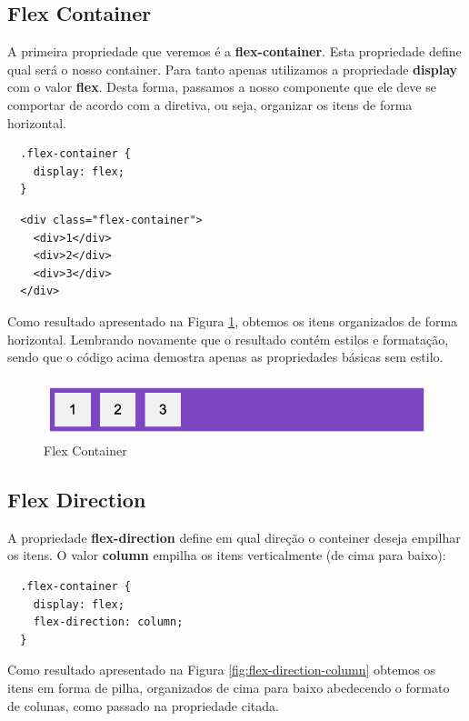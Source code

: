 \subsection{Flex Container}

A primeira propriedade que veremos é a \textbf{flex-container}. Esta propriedade define qual será o nosso container. Para tanto apenas utilizamos a propriedade \textbf{display} com o valor \textbf{flex}. Desta forma, passamos a nosso componente que ele deve se comportar de acordo com a diretiva, ou seja, organizar os itens de forma horizontal.

\begin{lstlisting}
  .flex-container {
    display: flex;
  } 
\end{lstlisting}

\begin{lstlisting}
  <div class="flex-container">
    <div>1</div>
    <div>2</div>
    <div>3</div>
  </div>
\end{lstlisting}

Como resultado apresentado na Figura \ref{fig:flex-container}, obtemos os itens organizados de forma horizontal. Lembrando novamente que o resultado contém estilos e formatação, sendo que o código acima demostra apenas as propriedades básicas sem estilo.

\begin{figure}[H]
  \centering
  \includegraphics[scale=0.5]{imagens/flex-container.png}
  \caption{Flex Container}
  \label{fig:flex-container}
\end{figure}

\subsection{Flex Direction}

A propriedade \textbf{flex-direction} define em qual direção o conteiner deseja empilhar os itens. O valor \textbf{column} empilha os itens verticalmente (de cima para baixo):

\begin{lstlisting}
  .flex-container {
    display: flex;
    flex-direction: column;
  } 
\end{lstlisting}

Como resultado apresentado na Figura \ref{fig:flex-direction-column} obtemos os itens em forma de pilha, organizados de cima para baixo abedecendo o formato de colunas, como passado na propriedade citada.

